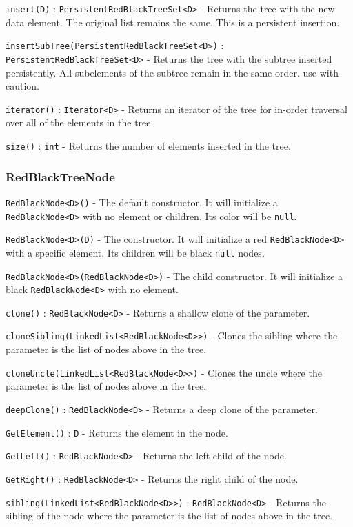 \documentclass[11pt]{article}
\begin{document}
\texttt{insert(D)} : \texttt{PersistentRedBlackTreeSet<D>} - Returns the tree with the new data element. The original list remains the same. This is a persistent insertion.

\texttt{insertSubTree(PersistentRedBlackTreeSet<D>)} : \texttt{PersistentRedBlackTreeSet<D>} - Returns the tree with the subtree inserted persistently. All subelements of the subtree remain in the same order. use with caution.

\texttt{iterator()} : \texttt{Iterator<D>} - Returns an iterator of the tree for in-order traversal over all of the elements in the tree.

\texttt{size()} : \texttt{int} - Returns the number of elements inserted in the tree.

\subsubsection{RedBlackTreeNode}
\label{sec:node}

\texttt{RedBlackNode<D>()} - The default constructor. It will initialize a \texttt{RedBlackNode<D>} with no element or children. Its color will be \texttt{null}.

\texttt{RedBlackNode<D>(D)} - The constructor. It will initialize a red \texttt{RedBlackNode<D>} with a specific element. Its children will be black \texttt{null} nodes.

\texttt{RedBlackNode<D>(RedBlackNode<D>)} - The child constructor. It will initialize a black \texttt{RedBlackNode<D>} with no element.

\texttt{clone()} : \texttt{RedBlackNode<D>} - Returns a shallow clone of the parameter.

\texttt{cloneSibling(LinkedList<RedBlackNode<D>>)} - Clones the sibling where the parameter is the list of nodes above in the tree.

\texttt{cloneUncle(LinkedList<RedBlackNode<D>>)}  - Clones the uncle where the parameter is the list of nodes above in the tree.

\texttt{deepClone()} : \texttt{RedBlackNode<D>} - Returns a deep clone of the parameter.

\texttt{GetElement()} : \texttt{D} - Returns the element in the node.

\texttt{GetLeft()}  : \texttt{RedBlackNode<D>} - Returns the left child of the node.

\texttt{GetRight()} : \texttt{RedBlackNode<D>} - Returns the right child of the node.

\texttt{sibling(LinkedList<RedBlackNode<D>>)} : \texttt{RedBlackNode<D>} - Returns the sibling of the node where the parameter is the list of nodes above in the tree.
\end{document}

